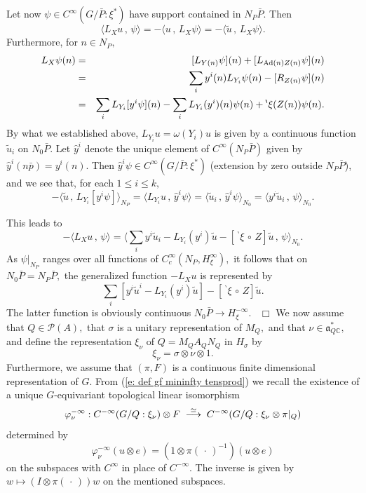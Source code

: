 \documentclass[12pt,a4paper]{article}
\def\qed{~\hfill\hbox{$\Box$}\medbreak}
\def\msy#1{{\mathbb #1}}
\def\C{{\msy C}}
\def\gf{\varphi}
\def\gs{\sigma}
\def\got#1{\mathfrak #1}
\def\fa{{\got a}}
\def\to{\rightarrow}
\def\inp#1#2{\langle#1\,,\,#2\rangle}
\def\Ad{{\rm Ad}}
\def\after{\,{\scriptstyle\circ}\,}
\def\iC{{\scriptscriptstyle \C}}
\def\cP{{\mathcal P}}
\numberwithin{Thm}{section}
\numberwithin{equation}{section}
\def\dotvar{\, \cdot\,}
\numberwithin{equation}{section}
\def\bp{\!{\,}^\backprime}
\def\faQdc{\fa_{Q\iC}^*}
\begin{document}
%
Let now $\psi \in C^\infty(G/\bar P: \xi^*)$ have support contained in 
$N_P \bar P.$ 
Then 
$$
\inp{L_X u}{\psi} = - \inp{u}{L_X \psi} = - \inp{\tilde u} {L_X\psi}.
$$ 
Furthermore, for $n \in N_P,$ 
\begin{eqnarray*}
L_X \psi(n) & = & [ L_{Y(n)}\psi] (n) +[ L_{\Ad(n) Z(n)} \psi](n)\\ 
& = & \sum_i y^i(n) L_{Y_i} \psi (n)-  [R_{Z(n)}\psi](n) \\
&=&  \sum_i L_{Y_i} [y^i \psi](n) - \sum_i L_{Y_i}(y^i)(n)\psi(n) + \bp \xi(Z(n))\psi(n).
\end{eqnarray*}
By what we established above, $L_{Y_i} u = \omega(Y_i) u$ is given by 
a continuous function $\tilde u_i$ on $N_0 \bar P.$ 
Let $\hat y^i$ denote the unique element of $C^\infty (N_P\bar P)$ given  
by $\hat y^i (n \bar p) = y^i (n).$
Then $\hat y^i \psi \in C^\infty(G/\bar P : \xi^*)$ (extension by zero outside $N_P \bar P$), and we see that, for each $1 \leq i \leq k,$
$$
- \inp{\tilde u} {L_{Y_i} [y^i \psi]}_{N_P} = \inp{L_{Y_i}u }{\hat y^i\psi} =  \inp{\tilde u_i}{\hat y^i \psi}_{N_0} =
\inp{y^i \tilde u_i }{\psi}_{N_0}.
$$ 

This leads to
$$ 
- \inp{L_X u}{\psi} = \inp{\sum_i  y^i \tilde u_i  - L_{Y_i}(y^i) \tilde u - [\bp \xi\after Z]\tilde u}{\psi}_{N_0}.
$$ 
As $\psi|_{N_P}$ ranges over all functions of $C_c^\infty(N_P, H_\xi^\infty),$ 
it follows that on $N_0\bar P = N_P \bar P,$ the generalized function 
$- L_X u$ is represented by 
$$ 
\sum_i [y^i  \tilde u^i  - L_{Y_i}(y^i) \tilde u] - [\bp\xi\after Z]\tilde u.
$$ 
The latter function is obviously continuous $N_0\bar P \to H_\xi^{-\infty}.$ 
\qed
%
We now assume that $Q \in \cP(A),$ that $\gs$ is a unitary representation of $M_Q,$ 
and that  $\nu \in \faQdc,$ and define the representation $\xi_\nu$ of $Q= M_Q A_Q N_Q$ in $H_\gs$ by 
$$
\xi_\nu = \gs \otimes \nu \otimes 1.
$$
Furthermore, we assume that $(\pi, F)$ is a continuous finite dimensional representation of $G.$ 
From (\ref{e: def gf mininfty tensprod}) we recall the existence
of a unique $G$-equivariant topological linear isomorphism 
\begin{equation}
\label{e: gf gl} 
\gf_\nu^{-\infty}: C^{-\infty}(G/Q:\xi_\nu) \otimes F \;\;{\buildrel \simeq \over \longrightarrow}\;\; C^{-\infty}(G/Q:\xi_\nu \otimes \pi|_Q) 
\end{equation} 
determined by 
$$ 
\gf_\nu^{-\infty}(u \otimes e)  = (1 \otimes \pi(\dotvar)^{-1}) ( u  \otimes  e)
$$ 
on the subspaces with $C^\infty$ in place of $C^{-\infty}.$ 
The inverse is given by $w \mapsto ( I \otimes \pi(\dotvar) ) w$ 
on the mentioned subspaces.
\end{document}
